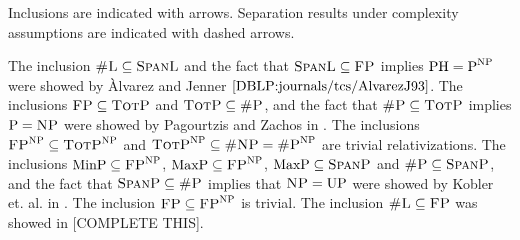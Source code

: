 Inclusions are indicated with arrows. Separation results under complexity assumptions are indicated with dashed arrows.

The inclusion $\textsc{\#L} \subseteq \textsc{SpanL}$ and the fact that $\textsc{SpanL} \subseteq \text{{\sc FP}}$ implies $\text{PH} = \text{P}^{\text{{\sc NP}}}$ were showed by Àlvarez and Jenner $\cite{DBLP:journals/tcs/AlvarezJ93}$. The inclusions $\text{{\sc FP}} \subseteq \textsc{TotP}$ and $\textsc{TotP} \subseteq \textsc{\#P}$, and the fact that $\textsc{\#P} \subseteq \textsc{TotP}$ implies $\text{P} = \text{{\sc NP}}$ were showed by Pagourtzis and Zachos in \cite{DBLP:conf/mfcs/PagourtzisZ06}. The inclusions $\text{{\sc FP}}^{\text{{\sc NP}}} \subseteq \textsc{TotP}^{\text{{\sc NP}}}$ and $\textsc{TotP}^{\text{{\sc NP}}} \subseteq \textsc{\#NP} = \textsc{\#P}^{\text{{\sc NP}}}$ are trivial relativizations. The inclusions $\text{MinP} \subseteq \text{{\sc FP}}^{\text{{\sc NP}}}$, $\text{MaxP} \subseteq \text{{\sc FP}}^{\text{{\sc NP}}}$, $\text{MaxP} \subseteq \textsc{SpanP}$ and $\textsc{\#P} \subseteq \textsc{SpanP}$, and the fact that $\textsc{SpanP} \subseteq \textsc{\#P}$ implies that $\text{{\sc NP}} = \text{UP}$ were showed by Kobler et. al. in \cite{DBLP:journals/acta/KoblerST89}. The inclusion $\text{{\sc FP}} \subseteq \text{{\sc FP}}^{\text{{\sc NP}}}$ is trivial. The inclusion $\textsc{\#L} \subseteq \text{{\sc FP}}$ was showed in [COMPLETE THIS].

